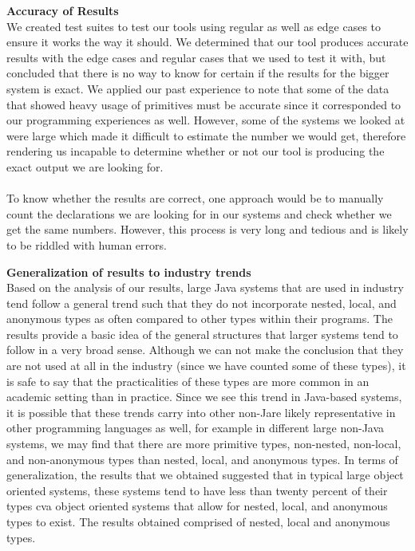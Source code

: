 \documentclass{assignment}
\begin{document}
\begin{enumerate}
\textbf{Accuracy of Results}\\

We created test suites to test our tools using regular as well as edge cases to ensure it works the way it should. We determined that our tool produces accurate results with the edge cases and regular cases that we used to test it with, but concluded that there is no way to know for certain if the results for the bigger system is exact. We applied our past experience to note that some of the data that showed heavy usage of primitives must be accurate since it corresponded to our programming experiences as well. However, some of the systems we looked at were large which made it difficult to estimate the number we would get, therefore rendering us incapable to determine whether or not our tool is producing the exact output we are looking for. \\
\\To know whether the results are correct, one approach would be to manually count the declarations we are looking for in our systems and check whether we get the same numbers. However, this process is very long and tedious and is likely to be riddled with human errors. 

\textbf{Generalization of results to industry trends}\\

Based on the analysis of our results, large Java systems that are used in industry tend follow a general trend such that they do not incorporate nested, local, and anonymous types as often compared to other types within their programs. The results provide a basic idea of the general structures that larger systems tend to follow in a very broad sense. Although we can not make the conclusion that they are not used at all in the industry (since we have counted some of these types), it is safe to say that the practicalities of these types are more common in an academic setting than in practice. Since we see this trend in Java-based systems, it is possible that these trends carry into other non-Jare likely representative in other programming languages as well, for example in different large non-Java systems, we may find that there are more primitive types, non-nested, non-local, and non-anonymous types than nested, local, and anonymous types. In terms of generalization, the results that we obtained suggested that in typical large object oriented systems, these systems tend to have less than twenty percent of their types cva object oriented systems that allow for nested, local, and anonymous types to exist. The results obtained comprised of nested, local and anonymous types.\\


\end{enumerate}
\end{document}
